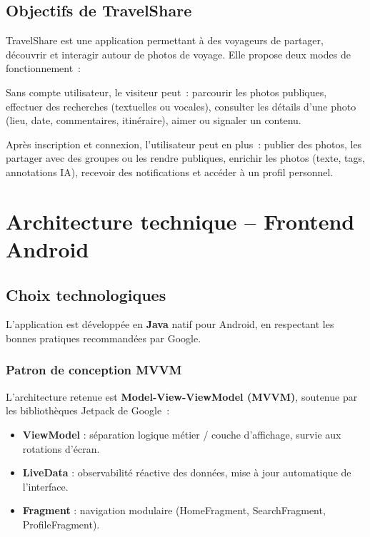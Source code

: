 \documentclass[12pt, a4paper, openany]{report}
\begin{document}
\section{Objectifs de TravelShare}

TravelShare est une application permettant à des voyageurs de partager, découvrir et interagir
autour de photos de voyage. Elle propose deux modes de fonctionnement~:

\begin{infobox}
Sans compte utilisateur, le visiteur peut~: parcourir les photos publiques, effectuer des
recherches (textuelles ou vocales), consulter les détails d'une photo (lieu, date,
commentaires, itinéraire), aimer ou signaler un contenu.
\end{infobox}

\begin{infobox}
Après inscription et connexion, l'utilisateur peut en plus~: publier des photos, les partager
avec des groupes ou les rendre publiques, enrichir les photos (texte, tags, annotations IA),
recevoir des notifications et accéder à un profil personnel.
\end{infobox}

\chapter{Architecture technique -- Frontend Android}

\section{Choix technologiques}

L'application est développée en \textbf{Java} natif pour Android, en respectant les bonnes
pratiques recommandées par Google.

\subsection{Patron de conception MVVM}

L'architecture retenue est \textbf{Model-View-ViewModel (MVVM)}, soutenue par les bibliothèques
Jetpack de Google~:

\begin{itemize}
  \item \textbf{ViewModel} : séparation logique métier / couche d'affichage, survie aux
        rotations d'écran.
  \item \textbf{LiveData} : observabilité réactive des données, mise à jour automatique de
        l'interface.
  \item \textbf{Fragment} : navigation modulaire (HomeFragment, SearchFragment, ProfileFragment).
\end{itemize}
\end{document}
